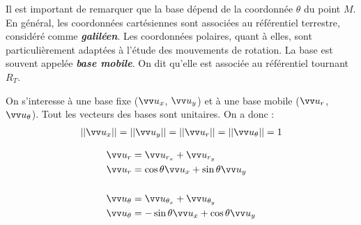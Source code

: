 \documentclass[10.5pt,a4paper]{book}
\begin{document}
\begin{boite}
Il est important de remarquer que la base dépend de la coordonnée $\theta$ du point $M$.\\

En général, les coordonnées cartésiennes sont associées au référentiel terrestre, considéré comme \emph{\textbf{galiléen}}. Les coordonnées polaires, quant à elles, sont particulièrement adaptées à l’étude des mouvements de rotation. La base est souvent appelée \emph{\textbf{base mobile}}. On dit qu’elle est associée au référentiel tournant $R_T$.

\begin{theoreme}
On s'interesse à une base fixe ($\vv u_x$, $\vv u_y$) et à une base mobile ($\vv u_r$, $\vv u_\theta$).
Tout les vecteurs des bases sont unitaires. On a donc : 
\begin{align*}
\left|\left|\vv u_x\right|\right|=\left|\left|\vv u_y\right|\right|=\left|\left|\vv u_r\right|\right|=\left|\left|\vv u_\theta\right|\right|=1
\end{align*}

\begin{minipage}{.38\textwidth}
\begin{flushleft}
\begin{align*}
\vv u_r &= \vv u_{r_x} + \vv u_{r_y} \\
\vv u_r &= \cos{\theta}\vv u_x + \sin{\theta}\vv u_y\\
&\\
\vv u_\theta &= \vv u_{\theta_x} + \vv u_{\theta_y} \\
\vv u_\theta &= -\sin{\theta}\vv u_x + \cos{\theta}\vv u_y
\end{align*}
\end{flushleft} 
\end{minipage}
\hfill
\begin{minipage}{.6\textwidth}
\end{minipage}
\end{theoreme}
\end{boite}
\end{document}
